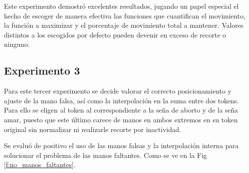 Este experimento demostró excelentes resultados, jugando un papel especial el hecho de escoger de manera efectiva las funciones que cuantifican el movimiento, la función a maximizar y el porcentaje de movimiento total a mantener. Valores distintos a los escogidos por defecto pueden devenir en exceso de recorte o ninguno.

\subsection{Experimento 3}
Para este tercer experimento se decide valorar el correcto posicionamiento y ajuste de la mano falsa, así como la interpolación en la suma entre dos tokens. Para ello se eligen al token al correspondiente a la seña de aborto y de la seña amar, puesto que este último carece de manos en ambos extremos en su token original sin normalizar ni realizarle recorte por inactividad.
  
Se evaluó de positivo el uso de las manos falsas y la interpolación interna para solucionar el problema de las manos faltantes. Como se ve en la Fig \ref{f:no_manos_faltantes}.

